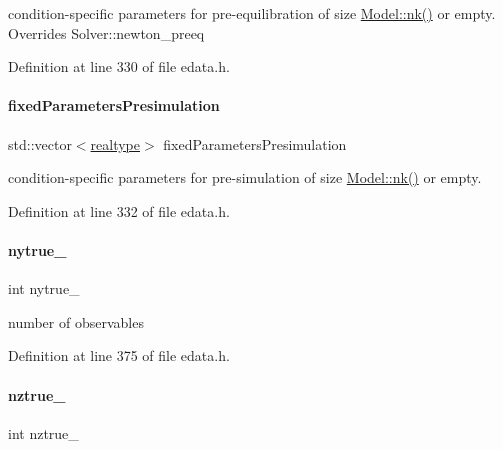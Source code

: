 condition-\/specific parameters for pre-\/equilibration of size \mbox{\hyperlink{classamici_1_1_model_a3d4130da64883565a06a86e7d6029da1}{Model\+::nk()}} or empty. Overrides Solver\+::newton\+\_\+preeq 

Definition at line 330 of file edata.\+h.

\mbox{\label{classamici_1_1_exp_data_a86fb66aedc21085f868fb6509a45c92d}} 
\paragraph{\texorpdfstring{fixed\+Parameters\+Presimulation}{fixedParametersPresimulation}}
{\footnotesize\ttfamily std\+::vector$<$\mbox{\hyperlink{namespaceamici_a1bdce28051d6a53868f7ccbf5f2c14a3}{realtype}}$>$ fixed\+Parameters\+Presimulation}

condition-\/specific parameters for pre-\/simulation of size \mbox{\hyperlink{classamici_1_1_model_a3d4130da64883565a06a86e7d6029da1}{Model\+::nk()}} or empty. 

Definition at line 332 of file edata.\+h.

\mbox{\label{classamici_1_1_exp_data_ad7e81d1df451bdfcc55008fa06f2f389}} 
\paragraph{\texorpdfstring{nytrue\+\_\+}{nytrue\_}}
{\footnotesize\ttfamily int nytrue\+\_\+\hspace{0.3cm}{\ttfamily [protected]}}

number of observables 

Definition at line 375 of file edata.\+h.

\mbox{\label{classamici_1_1_exp_data_a8913df548ec3837f9179a5ab63b32d13}} 
\paragraph{\texorpdfstring{nztrue\+\_\+}{nztrue\_}}
{\footnotesize\ttfamily int nztrue\+\_\+\hspace{0.3cm}{\ttfamily [protected]}}

